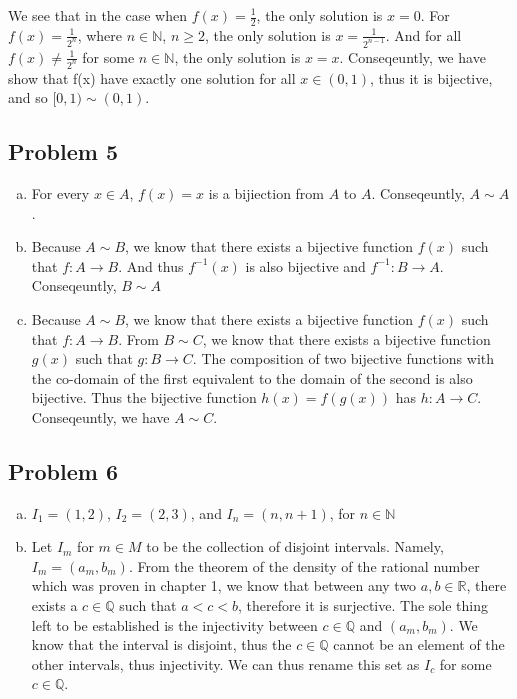 \documentclass[12pt]{article}
\begin{document}
\begin{enumerate}[a).]
{        We see that in the case when $f(x) = \frac{1}{2}$, the only solution is $x = 0$.
        For $f(x) = \frac{1}{2^n}$, where $n \in \mathbb{N}$, $n \ge 2$, the only solution is $x = \frac{1}{2^{n-1}}$. 
        And for all $ f(x) \ne \frac{1}{2^n}$ for some $n \in \mathbb{N}$, the only solution is $x = x$. 
        Conseqeuntly, we have show that f(x) have exactly one solution for all $x \in (0,1)$, thus it is bijective, and so $[0,1) \sim (0,1)$. 
    }

\end{enumerate}


\subsection*{Problem 5}
\begin{enumerate}[a).]
    \item {
        For every $x \in A$, $f(x) = x$ is a bijiection from $A$ to $A$. 
        Conseqeuntly, $A \sim A$. 
    }
    \item {
        Because $A \sim B$, we know that there exists a bijective function $f(x)$ such that $f: A \rightarrow B$. 
        And thus $f^{-1}(x)$ is also bijective and $f^{-1}: B \rightarrow A$. 
        Conseqeuntly, $B \sim A$
    }
    \item {
        Because $A \sim B$, we know that there exists a bijective function $f(x)$ such that $f: A \rightarrow B$. 
        From $B \sim C$, we know that there exists a bijective function $g(x)$ such that $g: B \rightarrow C$. 
        The composition of two bijective functions with the co-domain of the first equivalent to the domain of the second is also bijective. 
        Thus the bijective function $h(x) = f(g(x))$ has $h: A \rightarrow C$. Conseqeuntly, we have $A \sim C$. 

    }
\end{enumerate}


\subsection*{Problem 6}
\begin{enumerate}[a).]
    \item {
    $I_1 = (1, 2)$,
    $I_2 = (2, 3)$,
    and $I_n = (n, n+1)$, for $n \in \mathbb{N}$

    }
    \item {
        Let $I_m$ for $m \in M$ to be the collection of disjoint intervals.
        Namely, $I_m = (a_m, b_m)$. From the theorem of the density of the rational number which was proven in chapter 1, we know that between any two $a,b \in \mathbb{R}$, there exists a $c \in \mathbb{Q}$ such that $a < c < b$, therefore it is surjective.
        The sole thing left to be established is the injectivity between $c \in \mathbb{Q}$ and $(a_m, b_m)$. 
        We know that the interval is disjoint, thus the $c \in \mathbb{Q}$ cannot be an element of the other intervals, thus injectivity.
        We can thus rename this set as $I_c$ for some $c \in \mathbb{Q}$. 

    }
\end{enumerate}
\end{document}

